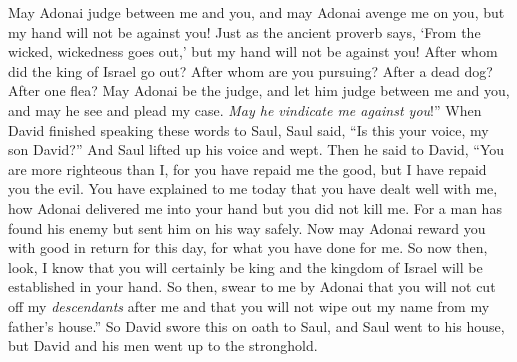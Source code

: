 \begin{biblechapter}
\verse May Adonai judge between me and you, and may Adonai avenge me on you, but my hand will not be against you!
\verse Just as the ancient proverb says, ‘From the wicked, wickedness goes out,’ but my hand will not be against you!
\verse After whom did the king of Israel go out? After whom are you pursuing? After a dead dog? After one flea?
\verse May Adonai be the judge, and let him judge between me and you, and may he see and plead my case. \textit{May he vindicate me against you}!”
\verse When David finished speaking these words to Saul, Saul said, “Is this your voice, my son David?” And Saul lifted up his voice and wept.
\verse Then he said to David, “You are more righteous than I, for you have repaid me the good, but I have repaid you the evil.
\verse You have explained to me today that you have dealt well with me, how Adonai delivered me into your hand but you did not kill me.
\verse For a man has found his enemy but sent him on his way safely. Now may Adonai reward you with good in return for this day, for what you have done for me.
\verse So now then, look, I know that you will certainly be king and the kingdom of Israel will be established in your hand.
\verse So then, swear to me by Adonai that you will not cut off my \textit{descendants} after me and that you will not wipe out my name from my father’s house.”
\verse So David swore this on oath to Saul, and Saul went to his house, but David and his men went up to the stronghold.
\end{biblechapter}

